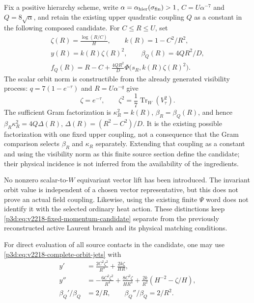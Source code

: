 \documentclass[12pt,a4paper]{article}
\begin{document}
\begin{definition}
\label{p3d:def:v2218-fixed-momentum-candidate}
Fix a positive hierarchy scheme, write
$\alpha=\alpha_{\rm hier}(\sigma_{\rm fin})>1$,
$C=U\alpha^{-7}$ and $Q=8\sqrt\alpha$, and retain the existing
upper quadratic coupling $Q$ as a constant in the following composed
candidate.  For $C\le R\le U$, set
\begin{gather}
 \zeta(R)=\frac{\log(R/C)}{H},\qquad
 k(R)=1-C^2/R^2,\nonumber\\
 y(R)=k(R)\zeta(R)^2,\qquad
 \beta_Q(R)=4QR^2/D,\nonumber\\
 \boxed{f_Q(R)=R-C+
     \frac{4QR^2}{D}\Phi\bigl(s_R,k(R)\zeta(R)^2\bigr).}
 \label{p3d:eq:v2218-fixed-momentum-candidate}
\end{gather}
The scalar orbit norm is constructible from the already generated
visibility process: $q=7(1-e^{-\tau})$ and $R=U\alpha^{-q}$ give
\begin{equation}
 \boxed{\zeta=e^{-\tau},\qquad
 \zeta^2=\frac17\operatorname{Tr}_W(V_\tau^2).}
 \label{p3d:eq:v2218-visibility-source-norm}
\end{equation}
The sufficient Gram factorization is
$\kappa_R^2=k(R)$, $\beta_R=\beta_Q(R)$, and hence
$\beta_R\kappa_R^2=4Q\Delta(R)$,
$\Delta(R)=(R^2-C^2)/D$.  It is the existing possible factorization
with one fixed upper coupling, not a consequence that the Gram
comparison selects $\beta_R$ and $\kappa_R$ separately.  Extending
that coupling as a constant and using the visibility norm as this
finite source section define the candidate; their physical incidence
is not inferred from the availability of the ingredients.
\end{definition}

No nonzero scalar-to-$W$ equivariant vector lift has been introduced.
The invariant orbit value is independent of a chosen vector
representative, but this does not prove an actual field coupling.
Likewise, using the existing finite $\Psi$ word does not identify it
with the selected ordinary heat action.  These distinctions keep
\eqref{p3d:eq:v2218-fixed-momentum-candidate} separate from the
previously reconstructed active Laurent branch and its physical
matching conditions.

For direct evaluation of all source contacts in the candidate, one may
use \eqref{p3d:eq:v2218-complete-orbit-jets} with
\begin{align}
 y'&=\frac{2C^2\zeta^2}{R^3}
           +\frac{2k\zeta}{HR},\nonumber\\
 y''&=-\frac{6C^2\zeta^2}{R^4}
       +\frac{8C^2\zeta}{HR^4}
       +\frac{2k}{R^2}(H^{-2}-\zeta/H),\nonumber\\
 \beta_Q'/\beta_Q&=2/R,
 \qquad \beta_Q''/\beta_Q=2/R^2.
 \label{p3d:eq:v2218-fixed-candidate-source-jets}
\end{align}
\end{document}

